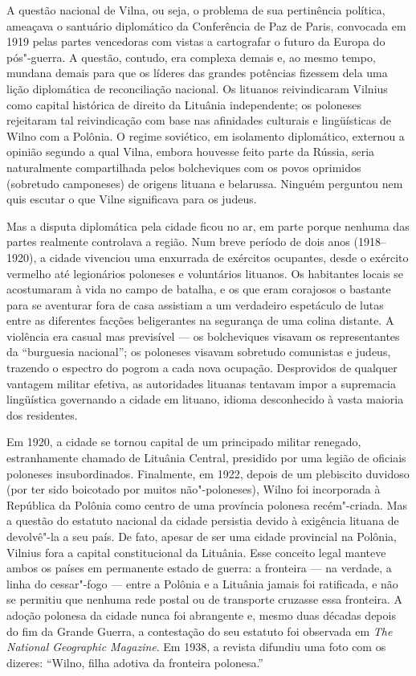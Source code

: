 A questão nacional de Vilna, ou seja, o problema de sua pertinência
política, ameaçava o santuário diplomático da Conferência de Paz de
Paris, convocada em 1919 pelas partes vencedoras com vistas a
cartografar o futuro da Europa do pós"-guerra. A questão, contudo, era
complexa demais e, ao mesmo tempo, mundana demais para que os líderes
das grandes potências fizessem dela uma lição diplomática de
reconciliação nacional. Os lituanos reivindicaram Vilnius como capital
histórica de direito da Lituânia independente; os poloneses rejeitaram
tal reivindicação com base nas afinidades culturais e lingüísticas de
Wilno com a Polônia. O regime soviético, em isolamento diplomático,
externou a opinião segundo a qual Vilna, embora houvesse feito parte da
Rússia, seria naturalmente compartilhada pelos bolcheviques com os povos
oprimidos (sobretudo camponeses) de origens lituana e belarussa. Ninguém
perguntou nem quis escutar o que Vilne significava para os judeus.

Mas a disputa diplomática pela cidade ficou no ar, em parte porque
nenhuma das partes realmente controlava a região. Num breve período de
dois anos (1918--1920), a cidade vivenciou uma enxurrada de exércitos
ocupantes, desde o exército vermelho até legionários poloneses e
voluntários lituanos. Os habitantes locais se acostumaram à vida no
campo de batalha, e os que eram corajosos o bastante para se aventurar
fora de casa assistiam a um verdadeiro espetáculo de lutas entre as
diferentes facções beligerantes na segurança de uma colina distante. A
violência era casual mas previsível --- os bolcheviques visavam os
representantes da ``burguesia nacional''; os poloneses visavam sobretudo
comunistas e judeus, trazendo o espectro do pogrom a cada nova ocupação.
Desprovidos de qualquer vantagem militar efetiva, as autoridades
lituanas tentavam impor a supremacia lingüística governando a cidade em
lituano, idioma desconhecido à vasta maioria dos residentes.

Em 1920, a cidade se tornou capital de um principado militar renegado,
estranhamente chamado de Lituânia Central, presidido por uma legião de
oficiais poloneses insubordinados. Finalmente, em 1922, depois de um
plebiscito duvidoso (por ter sido boicotado por muitos não"-poloneses),
Wilno foi incorporada à República da Polônia como centro de uma
província polonesa recém"-criada. Mas a questão do estatuto nacional da
cidade persistia devido à exigência lituana de devolvê"-la a seu país. De
fato, apesar de ser uma cidade provincial na Polônia, Vilnius fora a
capital constitucional da Lituânia. Esse conceito legal manteve ambos os
países em permanente estado de guerra: a fronteira --- na verdade, a linha
do cessar"-fogo --- entre a Polônia e a Lituânia jamais foi ratificada, e
não se permitiu que nenhuma rede postal ou de transporte cruzasse essa
fronteira. A adoção polonesa da cidade nunca foi abrangente e, mesmo
duas décadas depois do fim da Grande Guerra, a contestação do seu
estatuto foi observada em \emph{The National Geographic Magazine}. Em
1938, a revista difundiu uma foto com os dizeres: ``Wilno, filha adotiva
da fronteira polonesa.''

